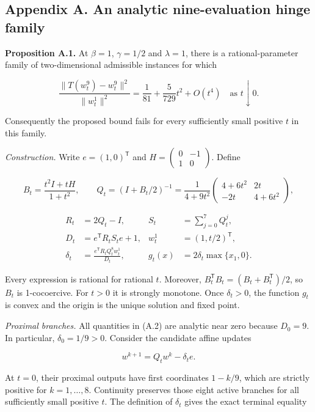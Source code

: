 \documentclass[
  british,
  11pt,
  a4paper,
]{article}
\let\oldsubsection\subsection
\renewcommand{\subsection}{\Needspace{5\baselineskip}\oldsubsection}
\begin{document}
\subsection{Appendix A. An analytic nine-evaluation hinge
family}\label{appendix-a.-an-analytic-nine-evaluation-hinge-family}

\textbf{Proposition A.1.} At \(\beta=1\), \(\gamma=1/2\) and
\(\lambda=1\), there is a rational-parameter family of two-dimensional
admissible instances for which

\[
\frac{\|T(w_t^9)-w_t^9\|^2}{\|w_t^1\|^2}
=\frac1{81}+\frac5{729}t^2+O(t^4)
\quad\text{as }t\downarrow0.
\tag{A.1}
\]

Consequently the proposed bound fails for every sufficiently small
positive \(t\) in this family.

\emph{Construction.} Write \(e=(1,0)^\mathsf T\) and
\(H=\left(\begin{smallmatrix}0&-1\\1&0\end{smallmatrix}\right)\). Define

\[
B_t=\frac{t^2I+tH}{1+t^2},
\qquad
Q_t=(I+B_t/2)^{-1}
=\frac1{4+9t^2}
\begin{pmatrix}4+6t^2&2t\\-2t&4+6t^2\end{pmatrix},
\]

\[
\begin{aligned}
R_t&=2Q_t-I,& S_t&=\sum_{j=0}^{7}Q_t^j,\\
D_t&=e^\mathsf T R_tS_te+1,& w_t^1&=(1,t/2)^\mathsf T,\\
\delta_t&=\frac{e^\mathsf T R_tQ_t^8w_t^1}{D_t},&
g_t(x)&=2\delta_t\max\{x_1,0\}.
\end{aligned}
\tag{A.2}
\]

Every expression is rational for rational \(t\). Moreover,
\(B_t^\mathsf TB_t=(B_t+B_t^\mathsf T)/2\), so \(B_t\) is 1-cocoercive.
For \(t>0\) it is strongly monotone. Once \(\delta_t>0\), the function
\(g_t\) is convex and the origin is the unique solution and fixed point.

\emph{Proximal branches.} All quantities in (A.2) are analytic near zero
because \(D_0=9\). In particular, \(\delta_0=1/9>0\). Consider the
candidate affine updates

\[w^{k+1}=Q_t w^k-\delta_t e.\]

At \(t=0\), their proximal outputs have first coordinates \(1-k/9\),
which are strictly positive for \(k=1,\ldots,8\). Continuity preserves
those eight active branches for all sufficiently small positive \(t\).
The definition of \(\delta_t\) gives the exact terminal equality
\end{document}
